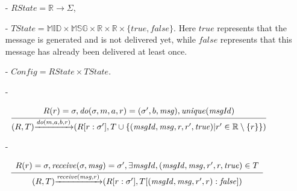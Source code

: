 \begin{itemize}
\setlength{\itemsep}{0.5pt}
\item[-] $\mathit{RState} = \mathbb{R} \rightarrow \Sigma$,

\item[-] $\mathit{TState} = \mathbb{MID} \times \mathbb{MSG} \times \mathbb{R} \times \mathbb{R} \times \{ \mathit{true},\mathit{false} \}$. Here $\mathit{true}$ represents that the message is generated and is not delivered yet, while $\mathit{false}$ represents that this message has already been delivered at least once.


\item[-] $\mathit{Config} = \mathit{RState} \times \mathit{TState}$.  

\item[-] 

$\begin{array}{l c}
   \bigfrac{
   \begin{array}{c}
     R(r) = \sigma, \mathit{do}(\sigma,m,a,r) = (\sigma',b,\mathit{msg}), \mathit{unique}(\mathit{msgId})
   \end{array}}
     {(R,T) {\xrightarrow{\mathit{do}(m,a,b,r)}} (R[r:\sigma'],T \cup \{ (\mathit{msgId},\mathit{msg},r,r',\mathit{true}) \vert r' \in \mathbb{R} \setminus \{ r \} \})}
\end{array}$

\item[-]

$\begin{array}{l c}
   \bigfrac{
   \begin{array}{c}
      R(r) = \sigma, \mathit{receive}(\sigma,\mathit{msg}) = \sigma', \exists \mathit{msgId},(\mathit{msgId},\mathit{msg},r',r,\mathit{true}) \in T
   \end{array}}
     {(R,T) {\xrightarrow{\mathit{receive}(\mathit{msg},r)}} (R[r:\sigma'],T[(\mathit{msgId},\mathit{msg},r',r):\mathit{false}])}
\end{array}$
\end{itemize}



